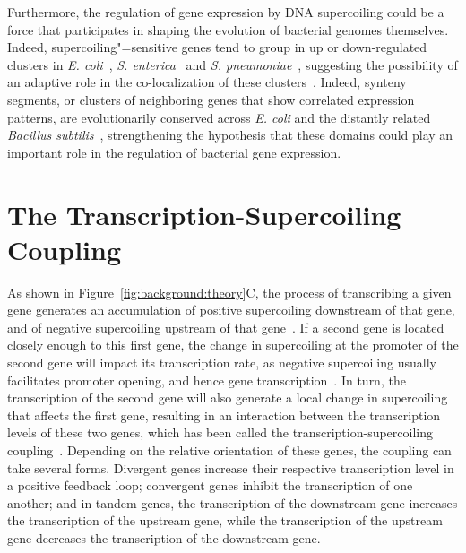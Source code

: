 Furthermore, the regulation of gene expression by DNA supercoiling could be a force that participates in shaping the evolution of bacterial genomes themselves.
Indeed, supercoiling"=sensitive genes tend to group in up or down-regulated clusters in \emph{E. coli}~\citep{peter2004}, \emph{S. enterica}~\citep{webber2013} and \emph{S. pneumoniae}~\citep{ferrandiz2010}, suggesting the possibility of an adaptive role in the co-localization of these clusters~\citep{sobetzko2016}.
Indeed, synteny segments, or clusters of neighboring genes that show correlated expression patterns, are evolutionarily conserved across \emph{E. coli} and the distantly related \emph{Bacillus subtilis}~\citep{junier2016}, strengthening the hypothesis that these domains could play an important role in the regulation of bacterial gene expression.


\section{The Transcription-Supercoiling Coupling}

As shown in Figure~\ref{fig:background:theory}C, the process of transcribing a given gene generates an accumulation of positive supercoiling downstream of that gene, and of negative supercoiling upstream of that gene~\citep{liu1987,visser2022}.
If a second gene is located closely enough to this first gene, the change in supercoiling at the promoter of the second gene will impact its transcription rate, as negative supercoiling usually facilitates promoter opening, and hence gene transcription~\citep{forquet2021}.
In turn, the transcription of the second gene will also generate a local change in supercoiling that affects the first gene, resulting in an interaction between the transcription levels of these two genes, which has been called the transcription-supercoiling coupling~\citep{meyer2014}.
Depending on the relative orientation of these genes, the coupling can take several forms.
Divergent genes increase their respective transcription level in a positive feedback loop; convergent genes inhibit the transcription of one another; and in tandem genes, the transcription of the downstream gene increases the transcription of the upstream gene, while the transcription of the upstream gene decreases the transcription of the downstream gene.

